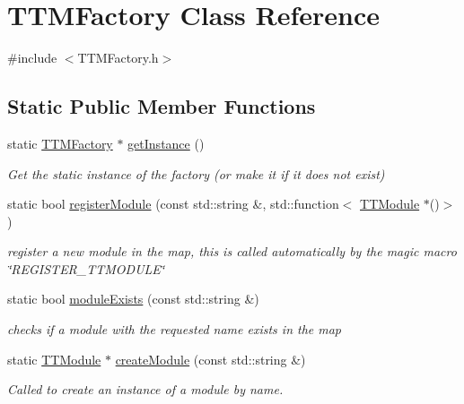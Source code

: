 \hypertarget{classTTMFactory}{\section{T\-T\-M\-Factory Class Reference}
\label{classTTMFactory}
}


{\ttfamily \#include $<$T\-T\-M\-Factory.\-h$>$}

\subsection*{Static Public Member Functions}
\begin{DoxyCompactItemize}
\item 
\hypertarget{classTTMFactory_a728fa564c6c1e78450c69a9a875746da}{static \hyperlink{classTTMFactory}{T\-T\-M\-Factory} $\ast$ \hyperlink{classTTMFactory_a728fa564c6c1e78450c69a9a875746da}{get\-Instance} ()}\label{classTTMFactory_a728fa564c6c1e78450c69a9a875746da}

\begin{DoxyCompactList}\small\item\em Get the static instance of the factory (or make it if it does not exist) \end{DoxyCompactList}\item 
\hypertarget{classTTMFactory_a4651a7e0c90b7c36acbdada8de05a4b4}{static bool \hyperlink{classTTMFactory_a4651a7e0c90b7c36acbdada8de05a4b4}{register\-Module} (const std\-::string \&, std\-::function$<$ \hyperlink{classTTModule}{T\-T\-Module} $\ast$()$>$)}\label{classTTMFactory_a4651a7e0c90b7c36acbdada8de05a4b4}

\begin{DoxyCompactList}\small\item\em register a new module in the map, this is called automatically by the magic macro \char`\"{}\-R\-E\-G\-I\-S\-T\-E\-R\-\_\-\-T\-T\-M\-O\-D\-U\-L\-E\char`\"{} \end{DoxyCompactList}\item 
\hypertarget{classTTMFactory_a163845785c393c0439208813162be341}{static bool \hyperlink{classTTMFactory_a163845785c393c0439208813162be341}{module\-Exists} (const std\-::string \&)}\label{classTTMFactory_a163845785c393c0439208813162be341}

\begin{DoxyCompactList}\small\item\em checks if a module with the requested name exists in the map \end{DoxyCompactList}\item 
\hypertarget{classTTMFactory_abe788ca7a99e646c7b4d89fa41eec5aa}{static \hyperlink{classTTModule}{T\-T\-Module} $\ast$ \hyperlink{classTTMFactory_abe788ca7a99e646c7b4d89fa41eec5aa}{create\-Module} (const std\-::string \&)}\label{classTTMFactory_abe788ca7a99e646c7b4d89fa41eec5aa}

\begin{DoxyCompactList}\small\item\em Called to create an instance of a module by name. \end{DoxyCompactList}\end{DoxyCompactItemize}


